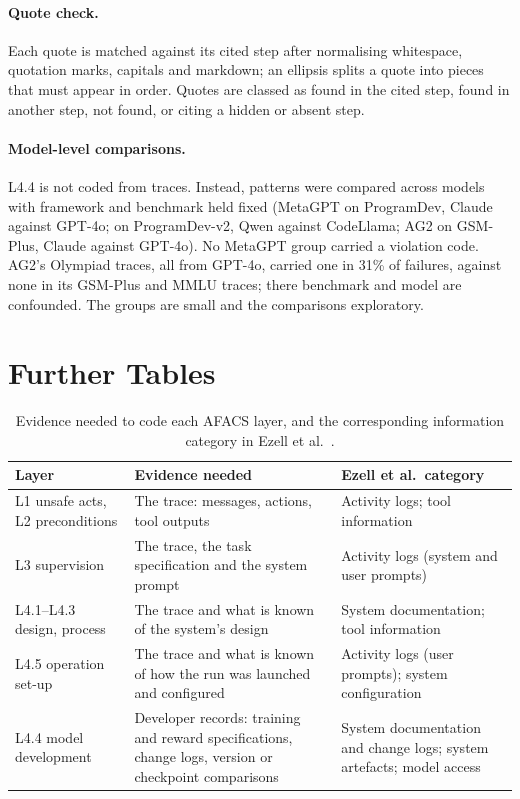 \documentclass[10pt,a4paper]{article}
\begin{document}
\paragraph{Quote check.} Each quote is matched against its cited step after
normalising whitespace, quotation marks, capitals and markdown; an ellipsis splits a
quote into pieces that must appear in order. Quotes are classed as found in the
cited step, found in another step, not found, or citing a hidden or absent step.

\paragraph{Model-level comparisons.} L4.4 is not coded from traces. Instead,
patterns were compared across models with framework and benchmark held fixed
(MetaGPT on ProgramDev, Claude against GPT-4o; on ProgramDev-v2, Qwen against
CodeLlama; AG2 on GSM-Plus, Claude against GPT-4o). No MetaGPT group carried a
violation code. AG2's Olympiad traces, all from GPT-4o, carried one in 31\% of
failures, against none in its GSM-Plus and MMLU traces; there benchmark and model
are confounded. The groups are small and the comparisons exploratory.

\section{Further Tables}
\label{app:tables}

\begin{table}[tbp]
\centering
\caption{Evidence needed to code each AFACS layer, and the corresponding
information category in Ezell et al.~\cite{ezell2025incident}.}
\label{tab:evsource}
\small
\begin{tabular}{@{}L{3.4cm}L{6.2cm}L{4.6cm}@{}}
\toprule
Layer & Evidence needed & Ezell et al.\ category\\
\midrule
L1 unsafe acts, L2 preconditions & The trace: messages, actions, tool outputs & Activity logs; tool information\\
L3 supervision & The trace, the task specification and the system prompt & Activity logs (system and user prompts)\\
L4.1--L4.3 design, process & The trace and what is known of the system's design & System documentation; tool information\\
L4.5 operation set-up & The trace and what is known of how the run was launched and configured & Activity logs (user prompts); system configuration\\
L4.4 model development & Developer records: training and reward specifications, change logs, version or checkpoint comparisons & System documentation and change logs; system artefacts; model access\\
\bottomrule
\end{tabular}
\end{table}
\end{document}
